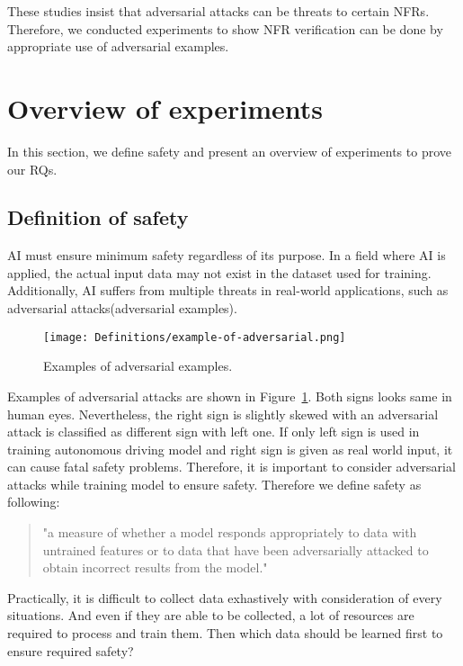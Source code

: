 \documentclass[symmetry,article,submit,moreauthors,pdftex]{Definitions/mdpi}
\begin{document}
These studies insist that adversarial attacks can be threats to certain NFRs. Therefore, we conducted experiments to show NFR verification can be done by appropriate use of adversarial examples.

\section{Overview of experiments}

In this section, we define safety and present an overview of experiments to prove our RQs.

\subsection{Definition of safety}

AI must ensure minimum safety regardless of its purpose. In a field where AI is applied, the actual input data may not exist in the dataset used for training.
Additionally, AI suffers from multiple threats in real-world applications, such as adversarial attacks(adversarial examples).

\begin{figure}[H]
\texttt{[image: Definitions/example-of-adversarial.png]}
\caption{Examples of adversarial examples.\label{example-of-adversarial}}
\end{figure}   

Examples of adversarial attacks are shown in Figure~\ref{example-of-adversarial}. Both signs looks same in human eyes. Nevertheless, the right sign is slightly skewed with an adversarial attack is classified as different sign with left one. 
If only left sign is used in training autonomous driving model and right sign is given as real world input, it can cause fatal safety problems. Therefore, it is important to consider adversarial attacks while training model to ensure safety.
Therefore we define safety as following:

\begin{quote}
    "a measure of whether a model responds appropriately to data with untrained features or to data that have been adversarially attacked to obtain incorrect results from the model."
\end{quote}

Practically, it is difficult to collect data exhastively with consideration of every situations. And even if they are able to be collected, a lot of resources are required to process and train them.
Then which data should be learned first to ensure required safety?
\end{document}
